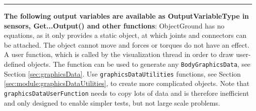 \par\noindent\rule{\textwidth}{0.4pt}
\label{description_ObjectGround}
{\bf The following output variables are available as OutputVariableType in sensors, Get...Output() and other functions}: 
\finishTable
 \noindent
    ObjectGround has no equations, as it only provides a static object, at which joints and connectors can be attached. The object cannot move and forces or torques do not have an effect. 
    A user function, which is called by the visualization thread in order to draw user-defined objects.
    The function can be used to generate any \texttt{BodyGraphicsData}, see Section \ref{sec:graphicsData}.
    Use \texttt{graphicsDataUtilities} functions, see Section \ref{sec:module:graphicsDataUtilities}, to create more complicated objects. 
    Note that \texttt{graphicsDataUserFunction} needs to copy lots of data and is therefore
    inefficient and only designed to enable simpler tests, but not large scale problems.
    \finishTable
    \userFunctionExample{}
    \pythonstyle
